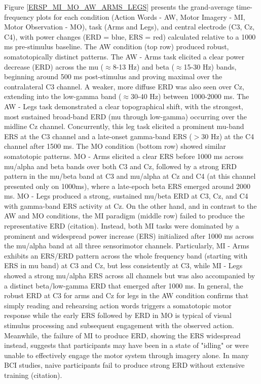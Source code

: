 \documentclass[10pt,letterpaper]{article}
\begin{document}
Figure \ref{ERSP_MI_MO_AW_ARMS_LEGS} presents the grand-average time-frequency plots for each condition (Action Words - AW, Motor Imagery - MI, Motor Observation - MO), task (Arms and Legs), and central electrode (C3, Cz, C4), with power changes (ERD = blue, ERS = red) calculated relative to a 1000 ms pre-stimulus baseline. The AW condition (top row) produced robust, somatotopically distinct patterns. The AW - Arms task elicited a clear power decrease (ERD) across the mu ($\approx$8-13 Hz) and beta ($\approx$15-30 Hz) bands, beginning around 500 ms post-stimulus and proving maximal over the contralateral C3 channel. A weaker, more diffuse ERD was also seen over Cz, extending into the low-gamma band ($\approx$30-40 Hz) between 1000-2000 ms. The AW - Legs task demonstrated a clear topographical shift, with the strongest, most sustained broad-band ERD (mu through low-gamma) occurring over the midline Cz channel. Concurrently, this leg task elicited a prominent mu-band ERS at the C3 channel and a late-onset gamma-band ERS ($>30$ Hz) at the C4 channel after 1500 ms. The MO condition (bottom row) showed similar somatotopic patterns. MO - Arms elicited a clear ERS before 1000 ms across mu/alpha and beta bands over both C3 and Cz, followed by a strong ERD pattern in the mu/beta band at C3 and mu/alpha at Cz and C4 (at this channel presented only on 1000ms), where a late-epoch beta ERS emerged around 2000 ms. MO - Legs produced a strong, sustained mu/beta ERD at C3, Cz, and C4 with gamma-band ERS activity at Cz. On the other hand, and in contrast to the AW and MO conditions, the MI paradigm (middle row) failed to produce the representative ERD (citation). Instead, both MI tasks were dominated by a prominent and widespread power increase (ERS) initialized after 1000 ms across the mu/alpha band at all three sensorimotor channels. Particularly, MI - Arms exhibits an ERS/ERD pattern across the whole frequency band (starting with ERS in mu band) at C3 and Cz, but less consistently at C3, while MI - Legs showed a strong mu/alpha ERS across all channels but was also accompanied by a distinct beta/low-gamma ERD that emerged after 1000 ms. In general, the robust ERD at C3 for arms and Cz for legs in the AW condition confirms that simply reading and rehearsing action words triggers a somatotopic motor response while the early ERS followed by ERD in MO is typical of visual stimulus processing and subsequent engagement with the observed action. Meanwhile, the failure of MI to produce ERD, showing the ERS widespread instead, suggests that participants may have been in a state of "idling" or were unable to effectively engage the motor system through imagery alone. In many BCI studies, naive participants fail to produce strong ERD without extensive training (citation). 
\end{document}
